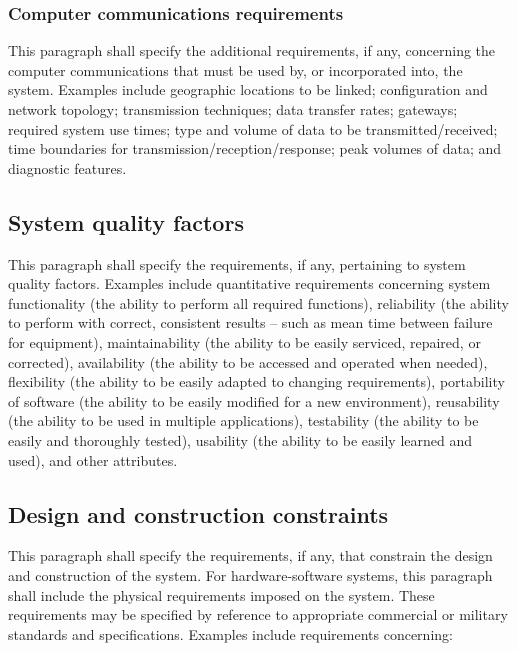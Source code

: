 \subsubsection{Computer communications requirements}

This paragraph shall specify the additional requirements, if any,
concerning the computer communications that must be used by, or
incorporated into, the system. Examples include geographic locations to
be linked; configuration and network topology; transmission techniques;
data transfer rates; gateways; required system use times; type and
volume of data to be transmitted/received; time boundaries for
transmission/reception/response; peak volumes of data; and diagnostic
features.

\subsection{System quality factors}

This paragraph shall specify the requirements, if any, pertaining to
system quality factors. Examples include quantitative requirements
concerning system functionality (the ability to perform all required
functions), reliability (the ability to perform with correct, consistent
results -- such as mean time between failure for equipment),
maintainability (the ability to be easily serviced, repaired, or
corrected), availability (the ability to be accessed and operated when
needed), flexibility (the ability to be easily adapted to changing
requirements), portability of software (the ability to be easily
modified for a new environment), reusability (the ability to be used in
multiple applications), testability (the ability to be easily and
thoroughly tested), usability (the ability to be easily learned and
used), and other attributes.

\subsection{Design and construction constraints}

This paragraph shall specify the requirements, if any, that constrain
the design and construction of the system. For hardware-software
systems, this paragraph shall include the physical requirements imposed
on the system. These requirements may be specified by reference to
appropriate commercial or military standards and specifications.
Examples include requirements concerning:

